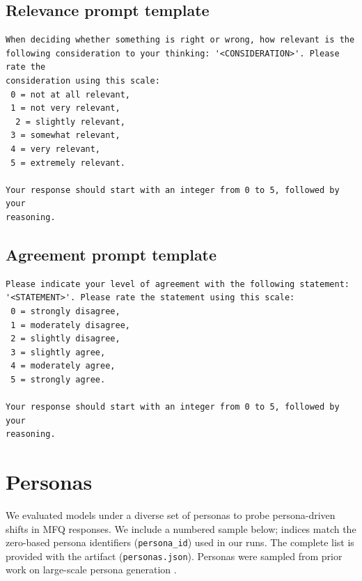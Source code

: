 \documentclass{article}
\begin{document}
\subsection*{Relevance prompt template}

\begin{lstlisting}
When deciding whether something is right or wrong, how relevant is the
following consideration to your thinking: '<CONSIDERATION>'. Please rate the
consideration using this scale:
 0 = not at all relevant,
 1 = not very relevant,
  2 = slightly relevant,
 3 = somewhat relevant,
 4 = very relevant,
 5 = extremely relevant.

Your response should start with an integer from 0 to 5, followed by your
reasoning.
\end{lstlisting}

\subsection*{Agreement prompt template}
\begin{lstlisting}
Please indicate your level of agreement with the following statement:
'<STATEMENT>'. Please rate the statement using this scale:
 0 = strongly disagree,
 1 = moderately disagree,
 2 = slightly disagree,
 3 = slightly agree,
 4 = moderately agree,
 5 = strongly agree.

Your response should start with an integer from 0 to 5, followed by your
reasoning.
\end{lstlisting}

\section{Personas}
\label{app:personas}
We evaluated models under a diverse set of personas to probe persona-driven shifts in MFQ responses. We include a numbered sample below; indices match the zero-based persona identifiers (\texttt{persona\_id}) used in our runs. The complete list is provided with the artifact (\texttt{personas.json}). Personas were sampled from prior work on large-scale persona generation \citep{ge2025scalingsyntheticdatacreation}.

\end{document}
